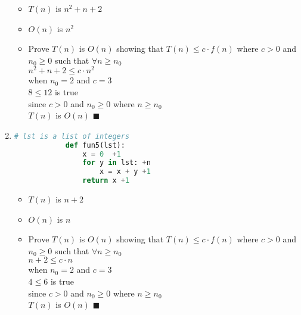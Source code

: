 \documentclass[11pt]{article}
\begin{document}
\begin{enumerate}[label=(\arabic*)]
\begin{itemize}
\item $T(n)$ is $n^2+n+2$
\item $O(n)$ is $n^2$

\item Prove $T(n)$ is $O(n)$ showing that $T(n) \leq c \cdot f(n)$ where $c > 0$ and $n_{0} \geq 0$ such that $ \forall  n \geq n_{0}$ \\ 

\centering $n^2+n+2\leq c \cdot n^2$  \\
\vspace{5pt}
when $n_{0} = 2$ and $c = 3$ \\
\vspace{5pt}
\centering $ 8 \leq 12$ is true\\
\vspace{5pt} 
since $c > 0$ and $ n_{0} \geq 0 $ where $ n \geq n_{0}$\\
\vspace{5pt}
 $T(n)$ is $O(n)$  $\blacksquare$

\noindent\makebox[\linewidth]{\rule{\paperwidth}{0.4pt}}
							
\end{itemize}

      \item \begin{lstlisting}[language=Python]
            # lst is a list of integers
            def fun5(lst):
                x = 0  +1
                for y in lst: +n
                    x = x + y +1
                return x +1
            \end{lstlisting}
\begin{itemize}
\item $T(n)$ is $n+2$
\item $O(n)$ is $n$

\item Prove $T(n)$ is $O(n)$ showing that $T(n) \leq c \cdot f(n)$ where $c > 0$ and $n_{0} \geq 0$ such that $ \forall  n \geq n_{0}$ \\ 

\centering $n+2\leq c \cdot n$  \\
\vspace{5pt}
when $n_{0} = 2$ and $c = 3$ \\
\vspace{5pt}
\centering $ 4 \leq 6$ is true\\
\vspace{5pt} 
since $c > 0$ and $ n_{0} \geq 0 $ where $ n \geq n_{0}$\\
\vspace{5pt}
 $T(n)$ is $O(n)$  $\blacksquare$

							
\end{itemize}
      \end{enumerate}
\end{document}
